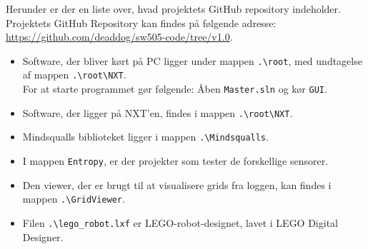 \label{kildekode}
Herunder er der en liste over, hvad projektets GitHub repository indeholder.
Projektets GitHub Repository kan findes på følgende adresse: \url{https://github.com/deaddog/sw505-code/tree/v1.0}.

\begin{itemize}
\item Software, der bliver kørt på PC ligger under mappen \lstinline[style=c]!.\root!, med undtagelse af mappen \lstinline[style=c]!.\root\NXT!.
\\
For at starte programmet gør følgende:
Åben \lstinline[style=c]!Master.sln! og kør \lstinline[style=c]!GUI!.
\item Software, der ligger på NXT'en, findes i mappen \lstinline[style=c]!.\root\NXT!.
\item Mindsqualls biblioteket ligger i mappen \lstinline[style=c]!.\Mindsqualls!.
\item I mappen \lstinline[style=c]!Entropy!, er der projekter som tester de forskellige sensorer.
\item Den viewer, der er brugt til at visualisere grids fra loggen, kan findes i mappen \lstinline[style=c]!.\GridViewer!.
\item Filen \lstinline[style=c]!.\lego_robot.lxf! er LEGO-robot-designet, lavet i LEGO Digital Designer.

\end{itemize}